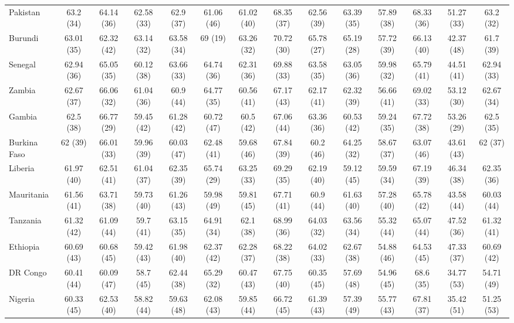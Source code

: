 \begin{longtable}{lccccccccccccc}
Pakistan & 63.2 (34) & 64.14 (36) & 62.58 (33) & 62.9 (37) & 61.06 (46) & 61.02 (40) & 68.35 (37) & 62.56 (39) & 63.39 (35) & 57.89 (38) & 68.33 (36) & 51.27 (33) & 63.2 (32) \\ 
Burundi & 63.01 (35) & 62.32 (42) & 63.14 (32) & 63.58 (34) & 69 (19) & 63.26 (32) & 70.72 (30) & 65.78 (27) & 65.19 (28) & 57.72 (39) & 66.13 (40) & 42.37 (48) & 61.7 (39) \\ 
Senegal & 62.94 (36) & 65.05 (35) & 60.12 (38) & 63.66 (33) & 64.74 (36) & 62.31 (36) & 69.88 (33) & 63.58 (35) & 63.05 (36) & 59.98 (32) & 65.79 (41) & 44.51 (41) & 62.94 (33) \\ 
Zambia & 62.67 (37) & 66.06 (32) & 61.04 (36) & 60.9 (44) & 64.77 (35) & 60.56 (41) & 67.17 (43) & 62.17 (41) & 62.32 (39) & 56.66 (41) & 69.02 (33) & 53.12 (30) & 62.67 (34) \\ 
Gambia & 62.5 (38) & 66.77 (29) & 59.45 (42) & 61.28 (42) & 60.72 (47) & 60.5 (42) & 67.06 (44) & 63.36 (36) & 60.53 (42) & 59.24 (35) & 67.72 (38) & 53.26 (29) & 62.5 (35) \\ 
Burkina Faso & 62 (39) & 66.01 (33) & 59.96 (39) & 60.03 (47) & 62.48 (41) & 59.68 (46) & 67.84 (39) & 60.2 (46) & 64.25 (32) & 58.67 (37) & 63.07 (46) & 43.61 (43) & 62 (37) \\ 
Liberia & 61.97 (40) & 62.51 (41) & 61.04 (37) & 62.35 (39) & 65.74 (29) & 63.25 (33) & 69.29 (35) & 62.19 (40) & 59.12 (45) & 59.59 (34) & 67.19 (39) & 46.34 (38) & 62.35 (36) \\ 
Mauritania & 61.56 (41) & 63.71 (38) & 59.73 (40) & 61.26 (43) & 59.98 (49) & 59.81 (45) & 67.71 (41) & 60.9 (44) & 61.63 (40) & 57.28 (40) & 65.78 (42) & 43.58 (44) & 60.03 (44) \\ 
Tanzania & 61.32 (42) & 61.09 (44) & 59.7 (41) & 63.15 (35) & 64.91 (34) & 62.1 (38) & 68.99 (36) & 64.03 (32) & 63.56 (34) & 55.32 (44) & 65.07 (44) & 47.52 (36) & 61.32 (41) \\ 
Ethiopia & 60.69 (43) & 60.68 (45) & 59.42 (43) & 61.98 (40) & 62.37 (42) & 62.28 (37) & 68.22 (38) & 64.02 (33) & 62.67 (38) & 54.88 (46) & 64.53 (45) & 47.33 (37) & 60.69 (42) \\ 
DR Congo & 60.41 (44) & 60.09 (47) & 58.7 (45) & 62.44 (38) & 65.29 (32) & 60.47 (43) & 67.75 (40) & 60.35 (45) & 57.69 (48) & 54.96 (45) & 68.6 (35) & 34.77 (53) & 54.71 (49) \\ 
Nigeria & 60.33 (45) & 62.53 (40) & 58.82 (44) & 59.63 (48) & 62.08 (43) & 59.85 (44) & 66.72 (45) & 61.39 (43) & 57.39 (49) & 55.77 (43) & 67.81 (37) & 35.42 (51) & 51.25 (53) \\ 

\end{longtable}
